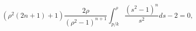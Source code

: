 \begin{equation}
\left(\rho^{2}(2n+1)+1\right)\frac{2\rho}{(\rho^{2}-1)^{n+1}}
\int^{\rho}_{p/k}\frac{(s^{2}-1)^{n}}{s^{2}}ds-2=0, \label{highlim}
\end{equation} 
